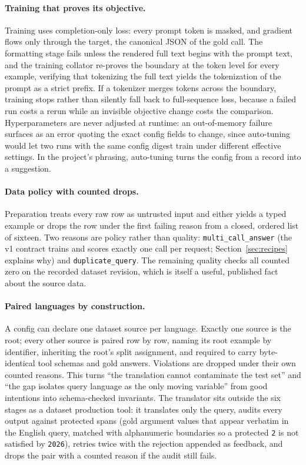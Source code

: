 \documentclass{article}
\begin{document}
\paragraph{Training that proves its objective.}
Training uses completion-only loss: every prompt token is masked, and gradient flows only through the target, the canonical JSON of the gold call. The formatting stage fails unless the rendered full text begins with the prompt text, and the training collator re-proves the boundary at the token level for every example, verifying that tokenizing the full text yields the tokenization of the prompt as a strict prefix. If a tokenizer merges tokens across the boundary, training stops rather than silently fall back to full-sequence loss, because a failed run costs a rerun while an invisible objective change costs the comparison. Hyperparameters are never adjusted at runtime: an out-of-memory failure surfaces as an error quoting the exact config fields to change, since auto-tuning would let two runs with the same config digest train under different effective settings. In the project's phrasing, auto-tuning turns the config from a record into a suggestion.

\paragraph{Data policy with counted drops.}
Preparation treats every raw row as untrusted input and either yields a typed example or drops the row under the first failing reason from a closed, ordered list of sixteen. Two reasons are policy rather than quality: \texttt{multi\_call\_answer} (the v1 contract trains and scores exactly one call per request; Section~\ref{sec:recipes} explains why) and \texttt{duplicate\_query}. The remaining quality checks all counted zero on the recorded dataset revision, which is itself a useful, published fact about the source data.

\paragraph{Paired languages by construction.}
A config can declare one dataset source per language. Exactly one source is the root; every other source is paired row by row, naming its root example by identifier, inheriting the root's split assignment, and required to carry byte-identical tool schemas and gold answers. Violations are dropped under their own counted reasons. This turns ``the translation cannot contaminate the test set'' and ``the gap isolates query language as the only moving variable'' from good intentions into schema-checked invariants. The translator sits outside the six stages as a dataset production tool: it translates only the query, audits every output against protected spans (gold argument values that appear verbatim in the English query, matched with alphanumeric boundaries so a protected \texttt{2} is not satisfied by \texttt{2026}), retries twice with the rejection appended as feedback, and drops the pair with a counted reason if the audit still fails.
\end{document}
